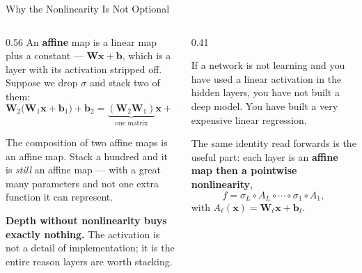 \begin{frame}{Why the Nonlinearity Is Not Optional}
\begin{columns}[T]
\begin{column}{0.56\textwidth}
\small
An \textbf{affine} map is a linear map plus a constant --- $\mathbf{W}\mathbf{x}+\mathbf{b}$, which is a layer with its activation stripped off. Suppose we drop $\sigma$ and stack two of them:
\[
  \mathbf{W}_2\bigl(\mathbf{W}_1\mathbf{x}+\mathbf{b}_1\bigr)+\mathbf{b}_2
  =\underbrace{(\mathbf{W}_2\mathbf{W}_1)}_{\text{one matrix}}\mathbf{x}
   +\underbrace{(\mathbf{W}_2\mathbf{b}_1+\mathbf{b}_2)}_{\text{one vector}} .
\]
\medskip

The composition of two affine maps is an affine map. Stack a hundred and it is \emph{still} an affine map --- with a great many parameters and not one extra function it can represent.
\medskip

\textbf{Depth without nonlinearity buys exactly nothing.} The activation is not a detail of implementation; it is the entire reason layers are worth stacking.
\end{column}
\begin{column}{0.41\textwidth}
\begin{takeawaybox}[title=\textbf{Say it as a warning}]\small
If a network is not learning and you have used a linear activation in the hidden layers, you have not built a deep model. You have built a very expensive linear regression.
\end{takeawaybox}
\medskip
\begin{conceptbox}\footnotesize
The same identity read forwards is the useful part: each layer is an \textbf{affine map then a pointwise nonlinearity},
\[
  f=\sigma_L\circ A_L\circ\cdots\circ\sigma_1\circ A_1 ,
\]
with $A_\ell(\mathbf{x})=\mathbf{W}_\ell\mathbf{x}+\mathbf{b}_\ell$.
\end{conceptbox}
\end{column}
\end{columns}
\vspace{1mm}
\end{frame}

